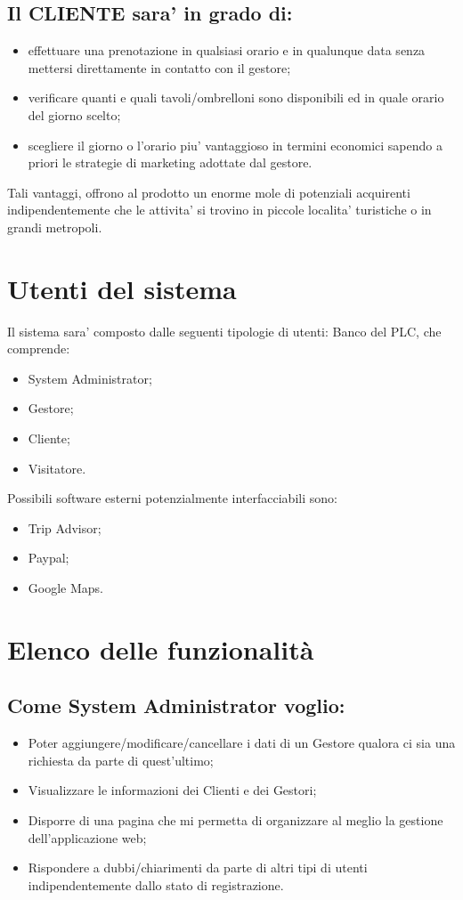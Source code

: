 \documentclass[a4paper]{article}
\begin{document}
\subsection{Il CLIENTE sara’ in grado di:}
\begin{itemize}
\item effettuare una prenotazione in qualsiasi orario e in qualunque data senza mettersi direttamente in contatto con il gestore;
\item verificare quanti e quali tavoli/ombrelloni sono disponibili ed in quale orario del giorno scelto;
\item scegliere il giorno o l’orario piu’ vantaggioso in termini economici sapendo a priori le strategie di marketing adottate dal gestore.
\end{itemize}

Tali vantaggi, offrono al prodotto un enorme mole di potenziali acquirenti indipendentemente  che le attivita’ si trovino in piccole localita’ turistiche o in grandi metropoli.

\section{Utenti del sistema}
Il sistema sara’ composto dalle seguenti tipologie di utenti:
Banco del PLC, che comprende:
\begin{itemize}
\item System Administrator;
\item Gestore;
\item Cliente;
\item Visitatore.
\end{itemize}
Possibili software esterni potenzialmente interfacciabili sono:

\begin{itemize}
\item Trip Advisor;
\item Paypal;
\item Google Maps.
\end{itemize}



\section{Elenco delle funzionalità}

\subsection{Come System Administrator voglio:}
\begin{itemize}
\item Poter aggiungere/modificare/cancellare i dati di un Gestore qualora ci sia una richiesta da parte di quest'ultimo;
\item Visualizzare le informazioni dei Clienti e dei Gestori;
\item Disporre di una pagina che mi permetta di organizzare al meglio la gestione dell'applicazione web;
\item Rispondere a dubbi/chiarimenti da parte di altri tipi di utenti indipendentemente dallo stato di registrazione.
\end{itemize}
\end{document}
